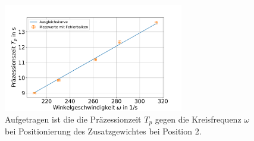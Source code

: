 \begin{figure}[h]
	\centering
	\includegraphics[width=0.7\textwidth]{res/sproHzmitte.pdf}
	\caption{Aufgetragen ist die die Präzessionzeit $T_p$ gegen die Kreisfrequenz $\omega$ bei Positionierung des Zusatzgewichtes bei Position 2.}
	\label{fig:Kreiselmitte}
\end{figure}


